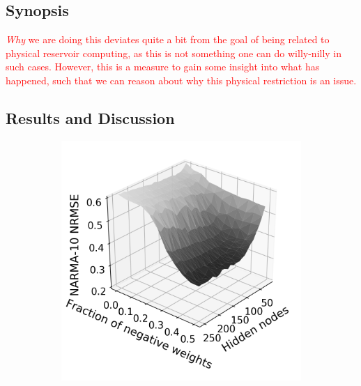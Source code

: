 \subsection{Synopsis}

\textcolor{red}{
  \textit{Why} we are doing this deviates quite a bit from the goal of being
related to physical reservoir computing, as this is not something one can do
willy-nilly in such cases. However, this is a measure to gain some insight into
what has happened, such that we can reason about why this physical restriction
is an issue.
}

\subsection{Results and Discussion}

\begin{figure}[t]
  \centering
  \begin{subfigure}{.49\textwidth}
    \centering
    \includegraphics[width=1.0\linewidth]{figures/perf-rest-undir.png}
    \caption{}
    \label{fig:perf-restore-a}
  \end{subfigure}
  \begin{subfigure}{.49\textwidth}
    \centering

\end{subfigure}
\end{figure}
